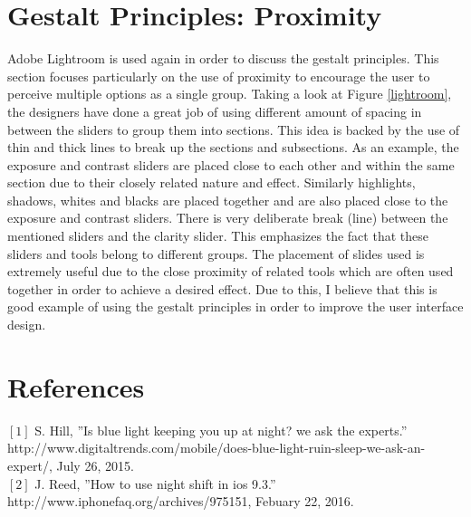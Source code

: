 \documentclass[12pt]{article}
\begin{document}
\section{Gestalt Principles: Proximity}
Adobe Lightroom is used again in order to discuss the gestalt principles. This section focuses particularly on the use of proximity to encourage the user to perceive multiple options as a single group. Taking a look at Figure \ref{lightroom}, the designers have done a great job of using different amount of spacing in between the sliders to group them into sections. This idea is backed by the use of thin and thick lines to break up the sections and subsections. As an example, the exposure and contrast sliders are placed close to each other and within the same section due to their closely related nature and effect. Similarly highlights, shadows, whites and blacks are placed together and are also placed close to the exposure and contrast sliders. There is very deliberate break (line) between the mentioned sliders and the clarity slider. This emphasizes the fact that these sliders and tools belong to different groups. The placement of slides used is extremely useful due to the close proximity of related tools which are often used together in order to achieve a desired effect. Due to this, I believe that this is good example of using the gestalt principles in order to improve the user interface design.

\newpage
\section{References}
$[1]$ S. Hill, ''Is blue light keeping you up at night? we ask the experts.''\\ 
http://www.digitaltrends.com/mobile/does-blue-light-ruin-sleep-we-ask-an-expert/, July 26, 2015.\\
$[2]$ J. Reed, ''How to use night shift in ios 9.3.''\\
http://www.iphonefaq.org/archives/975151, Febuary 22, 2016.
	
	
\end{document}
